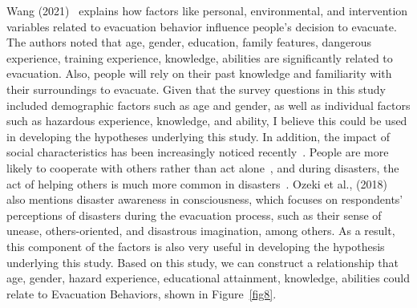 

Wang (2021)~\cite{ref9} explains how factors like personal, environmental, and intervention variables related to evacuation behavior influence people's decision to evacuate. The authors noted that age, gender, education, family features, dangerous experience, training experience, knowledge, abilities are significantly related to evacuation. Also, people will rely on their past knowledge and familiarity with their surroundings to evacuate. Given that the survey questions in this study included demographic factors such as age and gender, as well as individual factors such as hazardous experience, knowledge, and ability, I believe this could be used in developing the hypotheses underlying this study. In addition, the impact of social characteristics has been increasingly noticed recently~\cite{ref10}. People are more likely to cooperate with others rather than act alone~\cite{ref11}, and during disasters, the act of helping others is much more common in disasters~\cite{ref12}. Ozeki et al., (2018)~\cite{ref45} also mentions disaster awareness in consciousness, which focuses on respondents' perceptions of disasters during the evacuation process, such as their sense of unease, others-oriented, and disastrous imagination, among others. As a result, this component of the factors is also very useful in developing the hypothesis underlying this study. Based on this study, we can construct a relationship that age, gender, hazard experience,  educational attainment, knowledge, abilities could relate to Evacuation Behaviors, shown in Figure~\ref{fig8}. 

